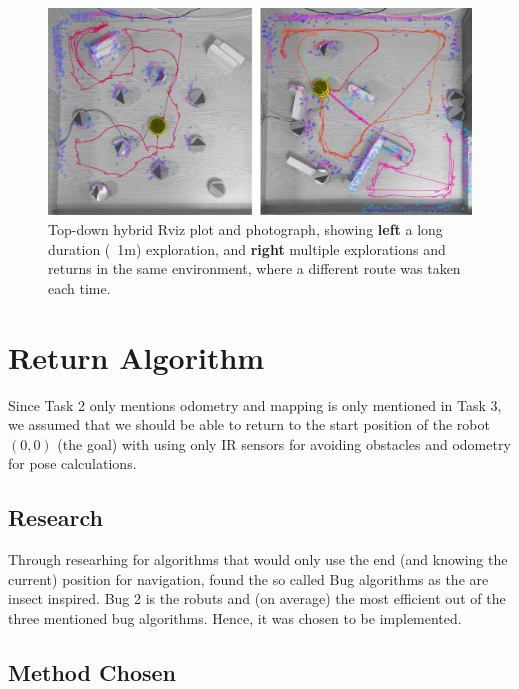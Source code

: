 \documentclass[11pt, a4paper]{article}
\begin{document}
\begin{figure}[h]
  \begin{center}
    \includegraphics[width=38em]{../assets/merged_top_fig.png}
  \end{center}
  \caption{Top-down hybrid Rviz plot and photograph, showing \textbf{left} a long duration (~1m)
    exploration, and \textbf{right} multiple explorations and returns in the same environment, where a
    different route was taken each time.}
\end{figure}

\newpage
\section{Return Algorithm}
\label{Return Algorithm}

Since Task 2 only mentions odometry and mapping is only mentioned in Task 3, we assumed that we should
be able to return to the start position of the robot ${(0,0)}$ (the goal) with using only IR sensors for avoiding obstacles
and odometry for pose calculations. 

\subsection{Research}

Through researhing for algorithms that would only use the end (and knowing the current) position for navigation, 
found the so called Bug algorithms as the are insect inspired. Bug 2 is the robuts and 
(on average) the most efficient out of the three mentioned bug algorithms. 
Hence, it was chosen to be implemented.


\subsection{Method Chosen}
\end{document}
